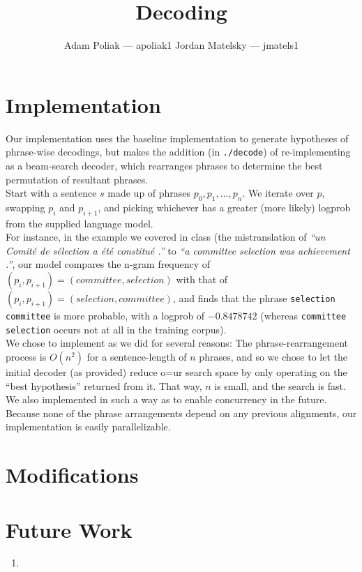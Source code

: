 \documentclass[a4paper]{article}
\title{Decoding}
\author{Adam Poliak — apoliak1 \: Jordan Matelsky — jmatels1}
\begin{document}
\maketitle

\section{Implementation}
Our implementation uses the baseline implementation to generate hypotheses of phrase-wise decodings, but makes the addition (in \texttt{./decode}) of re-implementing as a beam-search decoder, which rearranges phrases to determine the best permutation of resultant phrases. \\

Start with a sentence $s$ made up of phrases $p_0, p_1, \dots, p_n$. We iterate over $p$, swapping $p_i$ and $p_{i+1}$, and picking whichever has a greater (more likely) logprob from the supplied language model. \\

For instance, in the example we covered in class (the mistranslation of \textit{``un Comité de sélection a été constitué .''} to \textit{``a committee selection was achievement .''}, our model compares the n-gram frequency of $(p_i, p_{i+1})=({committee}, {selection})$ with that of $(p_i, p_{i+1})=({selection}, {committee})$, and finds that the phrase \texttt{selection committee} is more probable, with a logprob of $-0.8478742$ (whereas \texttt{committee selection} occurs not at all in the training corpus). \\

We chose to implement as we did for several reasons: The phrase-rearrangement process is $O(n^2)$ for a sentence-length of $n$ phrases, and so we chose to let the initial decoder (as provided) reduce o=ur search space  by only operating on the ``best hypothesis'' returned from it. That way, $n$ is small, and the search is fast. \\

We also implemented in such a way as to enable concurrency in the future. Because none of the phrase arrangements depend on any previous alignments, our implementation is easily parallelizable. \\

\section{Modifications}

\section{Future Work}

\begin{enumerate}
    \item \textbf{}
\end{enumerate}
\end{document}
